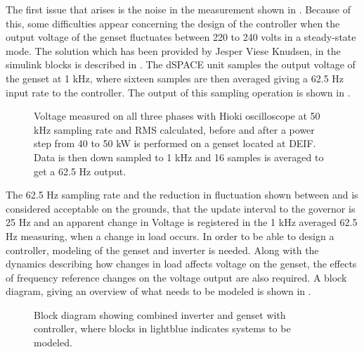 The first issue that arises is the noise in the measurement shown in . Because of this, some difficulties appear concerning the design of the controller when the output voltage of the genset fluctuates between 220 to 240 volts in a steady-state mode. The solution which has been provided by Jesper Viese Knudsen, in the simulink blocks is described in . The dSPACE unit samples the output voltage of the genset at 1 kHz, where sixteen samples are then averaged giving a 62.5 Hz input rate to the controller. The output of this sampling operation is shown in . 

\begin{figure}[H]
\centering
 
\caption{Voltage measured on all three phases with Hioki oscilloscope at 50 kHz sampling rate and RMS calculated, before and after a power step from 40 to 50 kW is performed on a genset located at DEIF. Data is then down sampled to 1 kHz and 16 samples is averaged to get a 62.5 Hz output.}
\label{fig:4050kwstepvoltage62.5hz}
\end{figure}

The 62.5 Hz sampling rate and the reduction in fluctuation shown between  and  is considered acceptable on the grounds, that the update interval to the governor is 25 Hz and an apparent change in Voltage is registered in the 1 kHz averaged 62.5 Hz measuring, when a change in load occurs. 
In order to be able to design a controller, modeling of the genset and inverter is needed. Along with the dynamics describing how changes in load affects voltage on the genset, the effects of frequency reference changes on the voltage output are also required. A block diagram, giving an overview of what needs to be modeled is shown in .



\begin{figure}[H]
\centering
 
\caption{Block diagram showing combined inverter and genset with controller, where blocks in lightblue indicates systems to be modeled.}
\label{fig:gensetmodeling}
\end{figure}




